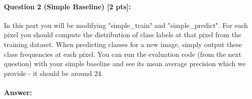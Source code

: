 \documentclass[11pt]{article}
\begin{document}
\begin{quote}
\end{quote}

\paragraph{Question 2 (Simple Baseline) [2 pts]:} 
In this part you will be modifying "simple\_train" and "simple\_predict". For each pixel you should compute the distribution of class labels at that pixel from the training dataset. When predicting classes for a new image, simply output these class frequencies at each pixel. You can run the evaluation code (from the next question) with your simple baseline and see its mean average precision which we provide - it should be around 24.
\paragraph{Answer:} 
\end{document}

